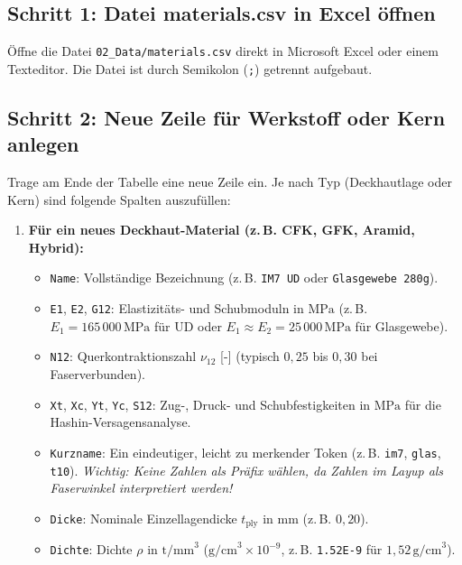 \subsection*{Schritt 1: Datei materials.csv in Excel öffnen}
Öffne die Datei \texttt{02\_Data/materials.csv} direkt in Microsoft Excel oder einem Texteditor. Die Datei ist durch Semikolon (\texttt{;}) getrennt aufgebaut.

\subsection*{Schritt 2: Neue Zeile für Werkstoff oder Kern anlegen}
Trage am Ende der Tabelle eine neue Zeile ein. Je nach Typ (Deckhautlage oder Kern) sind folgende Spalten auszufüllen:

\begin{enumerate}
    \item \textbf{Für ein neues Deckhaut-Material (z.\,B. CFK, GFK, Aramid, Hybrid):}
    \begin{itemize}
        \item \texttt{Name}: Vollständige Bezeichnung (z.\,B. \texttt{IM7 UD} oder \texttt{Glasgewebe 280g}).
        \item \texttt{E1}, \texttt{E2}, \texttt{G12}: Elastizitäts- und Schubmoduln in $\text{MPa}$ (z.\,B. $E_1 = 165\,000\,\text{MPa}$ für UD oder $E_1 \approx E_2 = 25\,000\,\text{MPa}$ für Glasgewebe).
        \item \texttt{N12}: Querkontraktionszahl $\nu_{12}$ [-] (typisch $0{,}25$ bis $0{,}30$ bei Faserverbunden).
        \item \texttt{Xt}, \texttt{Xc}, \texttt{Yt}, \texttt{Yc}, \texttt{S12}: Zug-, Druck- und Schubfestigkeiten in $\text{MPa}$ für die Hashin-Versagensanalyse.
        \item \texttt{Kurzname}: Ein eindeutiger, leicht zu merkender Token (z.\,B. \texttt{im7}, \texttt{glas}, \texttt{t10}). \textit{Wichtig: Keine Zahlen als Präfix wählen, da Zahlen im Layup als Faserwinkel interpretiert werden!}
        \item \texttt{Dicke}: Nominale Einzellagendicke $t_{\text{ply}}$ in $\text{mm}$ (z.\,B. $0{,}20$).
        \item \texttt{Dichte}: Dichte $\rho$ in $\text{t/mm}^3$ ($\text{g/cm}^3 \times 10^{-9}$, z.\,B. \texttt{1.52E-9} für $1{,}52\,\text{g/cm}^3$).
    \end{itemize}


\end{enumerate}
